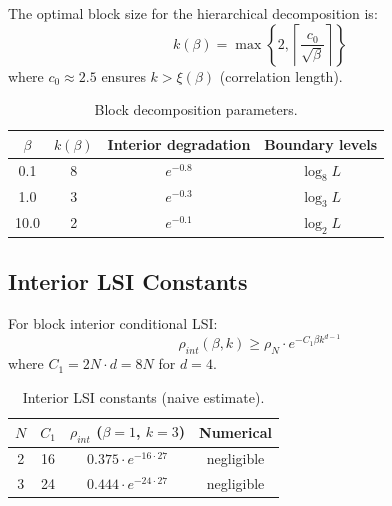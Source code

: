 \begin{theorem}
\label{thm:block-size}
The optimal block size for the hierarchical decomposition is:
\begin{equation}
k(\beta) = \max\left\{2, \left\lceil \frac{c_0}{\sqrt{\beta}} \right\rceil \right\}
\end{equation}
where $c_0 \approx 2.5$ ensures $k > \xi(\beta)$ (correlation length).
\end{theorem}

\begin{table}[ht]
\centering
\begin{tabular}{|c|c|c|c|}
\hline
$\beta$ & $k(\beta)$ & Interior degradation & Boundary levels \\
\hline
0.1 & 8 & $e^{-0.8}$ & $\log_8 L$ \\
1.0 & 3 & $e^{-0.3}$ & $\log_3 L$ \\
10.0 & 2 & $e^{-0.1}$ & $\log_2 L$ \\
\hline
\end{tabular}
\caption{Block decomposition parameters.}
\label{tab:blocks}
\end{table}

\subsection{Interior LSI Constants}

\begin{theorem}
\label{thm:interior-lsi-const}
For block interior conditional LSI:
\begin{equation}
\rho_{int}(\beta, k) \geq \rho_N \cdot e^{-C_1 \beta k^{d-1}}
\end{equation}
where $C_1 = 2N \cdot d = 8N$ for $d = 4$.
\end{theorem}

\begin{table}[ht]
\centering
\begin{tabular}{|c|c|c|c|}
\hline
$N$ & $C_1$ & $\rho_{int}$ ($\beta=1$, $k=3$) & Numerical \\
\hline
2 & 16 & $0.375 \cdot e^{-16 \cdot 27}$ & negligible \\
3 & 24 & $0.444 \cdot e^{-24 \cdot 27}$ & negligible \\
\hline
\end{tabular}
\caption{Interior LSI constants (naive estimate).}
\label{tab:interior}
\end{table}

